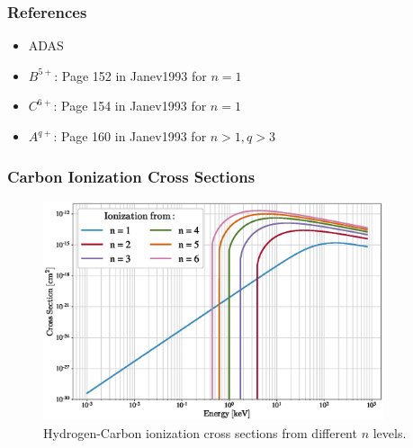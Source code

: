 \subsubsection{References}
\begin{itemize}
    \item ADAS\cite{adas}
    \item $B^{5+}$: Page 152 in Janev1993\cite{janev1993cross} for $n=1$
    \item $C^{6+}$: Page 154 in Janev1993\cite{janev1993cross} for $n=1$
    \item $A^{q+}$: Page 160 in Janev1993\cite{janev1993cross} for $n>1,q>3$
\end{itemize}
\subsubsection{Carbon Ionization Cross Sections}
\begin{figure}[h!]
    \centering
    \includegraphics[width=10cm]{figures/tables/H_C6_ioniz.eps}
    \caption{Hydrogen-Carbon ionization cross sections from different $n$ levels.}
    \label{fig:H_C6_ioniz}
\end{figure}